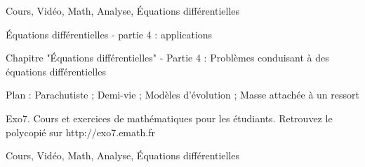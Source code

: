
Cours, Vidéo, Math, Analyse, Équations différentielles



Équations différentielles - partie 4 : applications


\video{}

Chapitre "Équations différentielles" - Partie 4 : Problèmes conduisant à des équations différentielles

Plan : Parachutiste ; Demi-vie ; Modèles d'évolution ;
Masse attachée à un ressort

Exo7. Cours et exercices de mathématiques pour les étudiants.
Retrouvez le polycopié sur http://exo7.emath.fr


Cours, Vidéo, Math, Analyse, Équations différentielles

